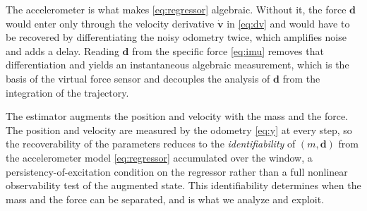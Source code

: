 \documentclass[lettersize,journal]{IEEEtran}
\newcommand{\vect}[1]{\bm{#1}}
\begin{document}
The accelerometer is what makes \eqref{eq:regressor} algebraic. Without it, the
force $\vect{d}$ would enter only through the velocity derivative
$\dot{\vect{v}}$ in \eqref{eq:dv} and would have to be recovered by
differentiating the noisy odometry twice, which amplifies noise and adds a
delay. Reading $\vect{d}$ from the specific force \eqref{eq:imu} removes that
differentiation and yields an instantaneous algebraic measurement, which is the
basis of the virtual force sensor and decouples the analysis of $\vect{d}$ from
the integration of the trajectory.

The estimator augments the position and velocity with the mass and the force.
The position and velocity are measured by the odometry \eqref{eq:y} at every step,
so the recoverability of the parameters reduces to the \emph{identifiability} of
$(m,\vect{d})$ from the accelerometer model \eqref{eq:regressor} accumulated over
the window, a persistency-of-excitation condition on the regressor rather than a
full nonlinear observability test of the augmented state. This identifiability
determines when the mass and the force can be separated, and is what we analyze
and exploit.
\end{document}
